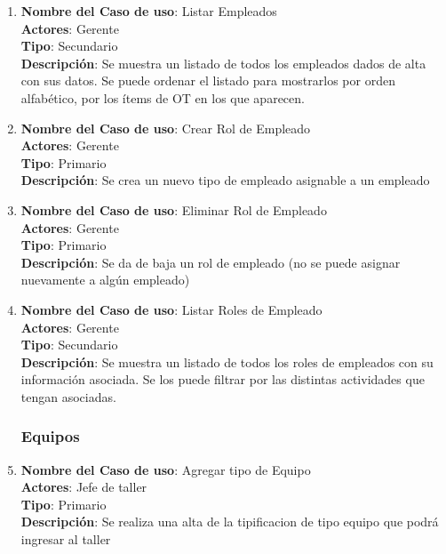 \documentclass[12pt]{extarticle}
\begin{document}
\begin{spacing}{1.2}
\begin{enumerate}
        \item 	\textbf{Nombre del Caso de uso}: Listar Empleados\\
                \textbf{Actores}: Gerente\\
                \textbf{Tipo}: Secundario\\
                \textbf{Descripción}: Se muestra un listado de todos los empleados dados de alta con sus datos. Se puede ordenar el listado para mostrarlos por orden alfabético, por los ítems de OT en los que aparecen.
        
        \item 	\textbf{Nombre del Caso de uso}: Crear Rol de Empleado\\
                \textbf{Actores}: Gerente\\
                \textbf{Tipo}: Primario\\
                \textbf{Descripción}: Se crea un nuevo tipo de empleado asignable a un empleado
        
        \item 	\textbf{Nombre del Caso de uso}: Eliminar Rol de Empleado\\
                \textbf{Actores}: Gerente\\
                \textbf{Tipo}: Primario\\
                \textbf{Descripción}: Se da de baja un rol de empleado (no se puede asignar nuevamente a algún empleado)
        
        \item 	\textbf{Nombre del Caso de uso}: Listar Roles de Empleado\\
                \textbf{Actores}: Gerente\\
                \textbf{Tipo}: Secundario\\
                \textbf{Descripción}: Se muestra un listado de todos los roles de empleados con su información asociada. Se los puede filtrar por las distintas actividades que tengan asociadas.
        


        \subsubsection{Equipos}



        \item 	\textbf{Nombre del Caso de uso}: Agregar tipo de Equipo\\
                \textbf{Actores}: Jefe de taller\\
                \textbf{Tipo}: Primario\\
                \textbf{Descripción}: Se realiza una alta de la tipificacion de tipo equipo que podrá ingresar al taller 
        

\end{enumerate}
\end{spacing}
\end{document}
